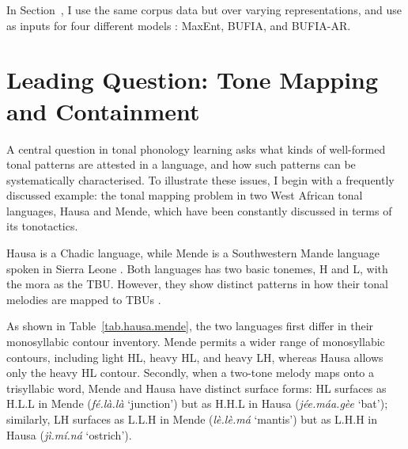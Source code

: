 In Section~, I use the same corpus data but over varying 
representations, and use as inputs for four different models :
MaxEnt, BUFIA, and BUFIA-AR.


\section{Leading Question: Tone Mapping and Containment} \label{sec:learning}

A central question in tonal phonology learning asks what kinds of 
well-formed tonal patterns are attested in a language, and how such 
patterns can be systematically characterised. 
To illustrate these issues, 
I begin with a frequently discussed example: the tonal mapping 
problem in two West African tonal languages, Hausa and Mende, which
have been constantly discussed in terms of its tonotactics.

Hausa is a Chadic language, while Mende is a Southwestern Mande 
language spoken in Sierra Leone \citep{lebenRepresentationTone1978}.
Both languages has two basic tonemes, H and L, with the mora as the TBU. However, they show distinct patterns in how their tonal
melodies are mapped to TBUs \citep{Newmanbook,
	lebenRepresentationTone1978, zoll2003optimal, jardine2017LocalNature}.  

  
As shown in Table~\ref{tab.hausa.mende}, the two languages first differ in their
monosyllabic contour inventory. Mende permits a wider range of monosyllabic contours, including 
light HL, heavy HL, and heavy LH, whereas Hausa allows only the heavy HL contour. 
Secondly, when a two-tone melody maps onto a trisyllabic word, Mende and 
Hausa have distinct surface forms: 
HL surfaces as H.L.L in Mende (\textit{fé.là.là} `junction') but as H.H.L in Hausa 
(\textit{jée.máa.gèe} `bat'); similarly, LH surfaces as L.L.H in Mende 
(\textit{lè.lè.má} `mantis') but as L.H.H in Hausa (\textit{jì.mí.ná} 
`ostrich').



